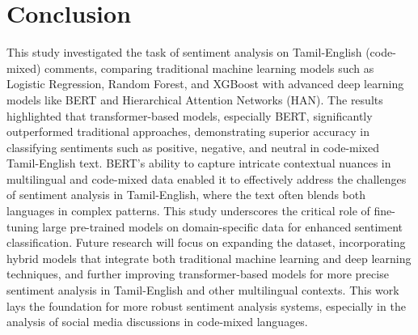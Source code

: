 \documentclass[11pt]{article}
\begin{document}
\section{Conclusion}
This study investigated the task of sentiment analysis on Tamil-English (code-mixed) comments, comparing traditional machine learning models such as Logistic Regression, Random Forest, and XGBoost with advanced deep learning models like BERT and Hierarchical Attention Networks (HAN). The results highlighted that transformer-based models, especially BERT, significantly outperformed traditional approaches, demonstrating superior accuracy in classifying sentiments such as positive, negative, and neutral in code-mixed Tamil-English text. BERT’s ability to capture intricate contextual nuances in multilingual and code-mixed data enabled it to effectively address the challenges of sentiment analysis in Tamil-English, where the text often blends both languages in complex patterns. This study underscores the critical role of fine-tuning large pre-trained models on domain-specific data for enhanced sentiment classification. Future research will focus on expanding the dataset, incorporating hybrid models that integrate both traditional machine learning and deep learning techniques, and further improving transformer-based models for more precise sentiment analysis in Tamil-English and other multilingual contexts. This work lays the foundation for more robust sentiment analysis systems, especially in the analysis of social media discussions in code-mixed languages.


\end{document}

